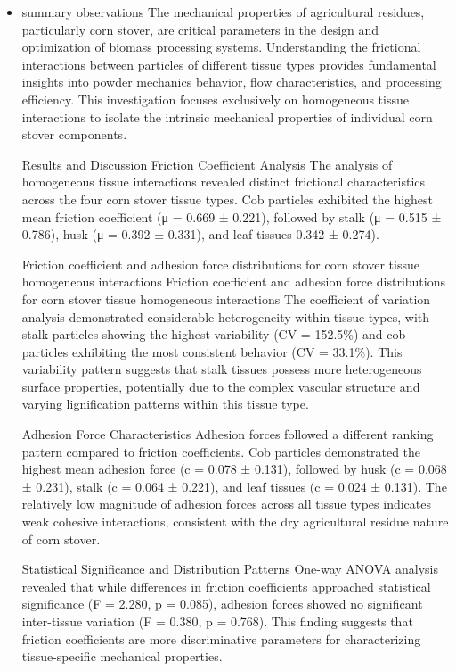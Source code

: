 \documentclass[xcolor=dvipsnames,10pt,hidelinks]{article}
\begin{document}
\begin{itemize}
\item summary observations
\label{sec:org193e1c8}
\begingroup\footnotesize
The mechanical properties of agricultural residues, particularly corn stover, are critical parameters in the design and optimization of biomass processing systems. Understanding the frictional interactions between particles of different tissue types provides fundamental insights into powder mechanics behavior, flow characteristics, and processing efficiency. This investigation focuses exclusively on homogeneous tissue interactions to isolate the intrinsic mechanical properties of individual corn stover components.

Results and Discussion
Friction Coefficient Analysis
The analysis of homogeneous tissue interactions revealed distinct frictional characteristics across the four corn stover tissue types. Cob particles exhibited the highest mean friction coefficient (μ = 0.669 ± 0.221), followed by stalk (μ = 0.515 ± 0.786), husk (μ = 0.392 ± 0.331), and leaf tissues 0.342 ± 0.274).

Friction coefficient and adhesion force distributions for corn stover tissue homogeneous interactions
Friction coefficient and adhesion force distributions for corn stover tissue homogeneous interactions
The coefficient of variation analysis demonstrated considerable heterogeneity within tissue types, with stalk particles showing the highest variability (CV = 152.5\%) and cob particles exhibiting the most consistent behavior (CV = 33.1\%). This variability pattern suggests that stalk tissues possess more heterogeneous surface properties, potentially due to the complex vascular structure and varying lignification patterns within this tissue type.

Adhesion Force Characteristics
Adhesion forces followed a different ranking pattern compared to friction coefficients. Cob particles demonstrated the highest mean adhesion force (c = 0.078 ± 0.131), followed by husk (c = 0.068 ± 0.231), stalk (c = 0.064 ± 0.221), and leaf tissues (c = 0.024 ± 0.131). The relatively low magnitude of adhesion forces across all tissue types indicates weak cohesive interactions, consistent with the dry agricultural residue nature of corn stover.

Statistical Significance and Distribution Patterns
One-way ANOVA analysis revealed that while differences in friction coefficients approached statistical significance (F = 2.280, p = 0.085), adhesion forces showed no significant inter-tissue variation (F = 0.380, p = 0.768). This finding suggests that friction coefficients are more discriminative parameters for characterizing tissue-specific mechanical properties.


\end{itemize}
\end{document}
